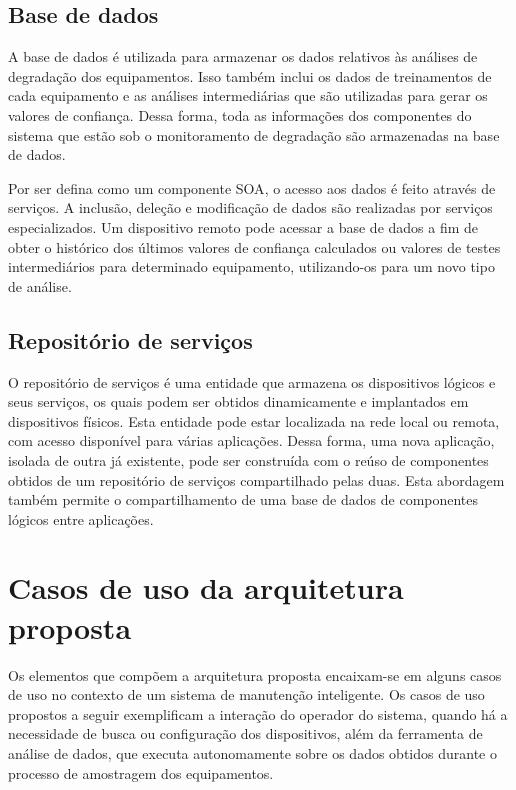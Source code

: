 \subsection{Base de dados}

A base de dados é utilizada para armazenar os dados relativos às análises de degradação dos
equipamentos. Isso também inclui os dados de treinamentos de cada equipamento e as análises
intermediárias que são utilizadas para gerar os valores de confiança. Dessa forma, toda as
informações dos componentes do sistema que estão sob o monitoramento de degradação são armazenadas
na base de dados.

Por ser defina como um componente \gls{SOA}, o acesso aos dados é feito através de serviços. A
inclusão, deleção e modificação de dados são realizadas por serviços especializados. Um dispositivo
remoto pode acessar a base de dados a fim de obter o histórico dos últimos valores de confiança
calculados ou valores de testes intermediários para determinado equipamento, utilizando-os para um
novo tipo de análise.



\subsection{Repositório de serviços}


O repositório de serviços é uma entidade que armazena os dispositivos lógicos e seus serviços, os
quais podem ser obtidos dinamicamente e implantados em dispositivos físicos. Esta entidade pode
estar localizada na rede local ou remota, com acesso disponível para várias aplicações. Dessa forma,
uma nova aplicação, isolada de outra já existente, pode ser construída com o reúso de componentes
obtidos de um repositório de serviços compartilhado pelas duas. Esta abordagem também permite o
compartilhamento de uma base de dados de componentes lógicos entre aplicações.


\section{Casos de uso da arquitetura proposta}

Os elementos que compõem a arquitetura proposta encaixam-se em alguns casos de uso no contexto de um
sistema de manutenção inteligente. Os casos de uso propostos a seguir exemplificam a interação do
operador do sistema, quando há a necessidade de busca ou configuração dos dispositivos, além da
ferramenta de análise de dados, que executa autonomamente sobre os dados obtidos durante o processo
de amostragem dos equipamentos.


